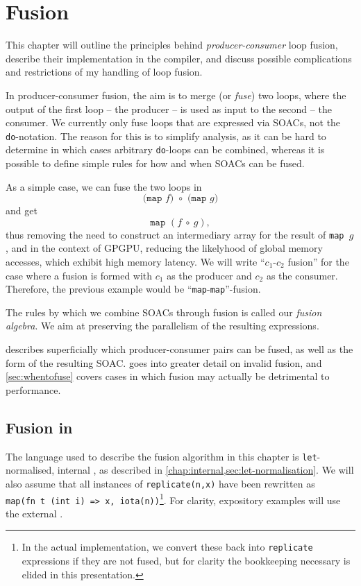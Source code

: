\chapter{Fusion}
\label{chap:fusion}

This chapter will outline the principles behind
\textit{producer-consumer} loop fusion, describe their implementation
in the \LO{} compiler, and discuss possible complications and
restrictions of my handling of loop fusion.

In producer-consumer fusion, the aim is to merge (or \textit{fuse})
two loops, where the output of the first loop -- the producer -- is
used as input to the second -- the consumer.  We currently only fuse
loops that are expressed via SOACs, not the \texttt{do}-notation.  The
reason for this is to simplify analysis, as it can be hard to
determine in which cases arbitrary \texttt{do}-loops can be combined,
whereas it is possible to define simple rules for how and when SOACs
can be fused.

As a simple case, we can fuse the two loops in
\[
\texttt{(map~$f$)~$\circ$~(map~$g$)}
\]
and get
\[
\texttt{map~$(f~\circ~g)$},
\]
thus removing the need to construct an intermediary array for the
result of \texttt{map~$g$}, and in the context of GPGPU, reducing the
likelyhood of global memory accesses, which exhibit high memory
latency.  We will write ``$c_{1}$-$c_{2}$ fusion'' for the case where
a fusion is formed with $c_{1}$ as the producer and $c_{2}$ as the
consumer.  Therefore, the previous example would be
``\texttt{map}-\texttt{map}''-fusion.

The rules by which we combine SOACs through fusion is called our
\textit{fusion algebra}.  We aim at preserving the parallelism of the
resulting expressions.

 describes superficially which
producer-consumer pairs can be fused, as well as the form of the
resulting SOAC.   goes into greater detail on
invalid fusion, and \cref{sec:whentofuse} covers cases in which fusion
may actually be detrimental to performance.

\section{Fusion in \LO{}}
\label{sec:fusion-in-l0}

The language used to describe the fusion algorithm in this chapter is
\texttt{let}-normalised, internal \LO{}, as described in
\cref{chap:internal,sec:let-normalisation}.  We will also assume that
all instances of \texttt{replicate(n,x)} have been rewritten as
\texttt{map(fn~t~(int~i)~=>~x,~iota(n))}\footnote{In the actual
  implementation, we convert these back into \texttt{replicate}
  expressions if they are not fused, but for clarity the bookkeeping
  necessary is elided in this presentation.}.  For clarity, expository
examples will use the external \LO{}.

